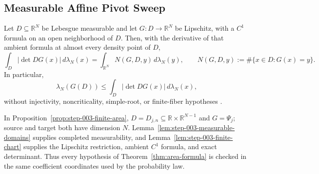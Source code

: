 \subsection{Measurable Affine Pivot Sweep}\label{app:step-003}

\begin{theorem}\label{thm:area-formula}
Let $D\subseteq\mathbb R^N$ be Lebesgue measurable and let $G:D\to\mathbb R^N$ be Lipschitz, with a
$C^1$ formula on an open neighborhood of $D$. Then, with the derivative of that ambient formula at almost
every density point of $D$,
\begin{equation}
\label{eq:appendix-display-053}
\int_D|\det DG(x)|\,d\lambda_N(x)
=\int_{\mathbb R^N}N(G,D,y)\,d\lambda_N(y),
\qquad
N(G,D,y):=\#\{x\in D:G(x)=y\}.
\end{equation}
In particular,
\begin{equation}
\label{eq:appendix-display-054}
\lambda_N(G(D))\leq\int_D|\det DG(x)|\,d\lambda_N(x),
\end{equation}
without injectivity, noncriticality, simple-root, or finite-fiber hypotheses \citep{federer1969gmt}.
\end{theorem}

In Proposition~\ref{prop:step-003-finite-area}, $D=D_{j,n}\subseteq\mathbb R\times\mathbb R^{N-1}$ and $G=\Psi_j$; source
and target both have dimension $N$. Lemma~\ref{lem:step-003-measurable-domains} supplies completed
measurability, and Lemma~\ref{lem:step-003-finite-chart} supplies the Lipschitz restriction, ambient $C^1$
formula, and exact determinant. Thus every hypothesis of Theorem~\ref{thm:area-formula} is checked in the
same coefficient coordinates used by the probability law.

